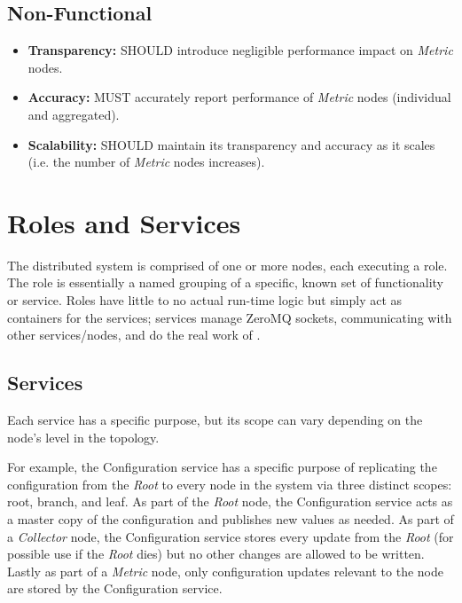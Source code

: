 \subsection{Non-Functional}

\begin{itemize}

\item \textbf{Transparency:} \dcamp SHOULD introduce negligible performance impact on \textit{Metric} nodes.
\item \textbf{Accuracy:} \dcamp MUST accurately report performance of \textit{Metric} nodes (individual and aggregated).
\item \textbf{Scalability:} \dcamp SHOULD maintain its transparency and accuracy as it scales (i.e. the number of
      \textit{Metric} nodes increases).

\end{itemize}

\section{\dcamp Roles and Services}
\label{roles_and_services}

The \dcamp distributed system is comprised of one or more nodes, each executing a role. The role is essentially a named
grouping of a specific, known set of functionality or service. Roles have little to no actual run-time logic but simply
act as containers for the services; services manage ZeroMQ sockets, communicating with other services/nodes, and do the
real work of \dcamp.

\subsection{Services}

Each \dcamp service has a specific purpose, but its scope can vary depending on the node's level in the \dcamp topology.

For example, the Configuration service has a specific purpose of replicating the \dcamp configuration from the
\textit{Root} to every node in the system via three distinct scopes: root, branch, and leaf. As part of the
\textit{Root} node, the Configuration service acts as a master copy of the configuration and publishes new values as
needed. As part of a \textit{Collector} node, the Configuration service stores every update from the \textit{Root} (for
possible use if the \textit{Root} dies) but no other changes are allowed to be written. Lastly as part of a
\textit{Metric} node, only configuration updates relevant to the node are stored by the Configuration service.


